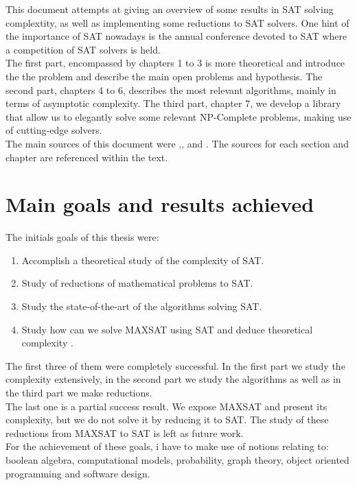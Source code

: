 This document attempts at giving an overview of some results in SAT solving complextity, as well as implementing some reductions to SAT solvers. One hint of the importance of SAT nowadays is the annual conference devoted to SAT where a competition of SAT solvers is held. \\

The first part, encompassed by chapters 1 to 3 is more theoretical and introduce the  the problem and describe the main open problems and hypothesis.
The second part, chapters 4 to 6, describes the most relevant algorithms, mainly in terms of asymptotic complexity. The third part, chapter 7, we develop a library that allow us to elegantly solve some relevant NP-Complete problems, making use of cutting-edge solvers.\\


The main sources of this document were \cite{schoning2013satisfiability},\cite{marek2009introduction},\cite{arora2009computational} and \cite{imms-sat18}. The sources for each section and chapter are referenced within the text.

\section*{Main goals and results achieved}
The initials goals of this thesis were:
\begin{enumerate}
\item Accomplish a theoretical study of the complexity of SAT.
\item Study of reductions of mathematical problems to SAT.
\item Study the state-of-the-art of the algorithms solving SAT.
\item Study how can we solve MAXSAT using SAT and deduce theoretical complexity .
\end{enumerate}

The first three of them were completely successful. In the first part we study the complexity extensively, in the second part we study the algorithms as well as in the third part we make reductions. \\

The last one is a partial success result. We expose MAXSAT and present its complexity, but we do not solve it by reducing it to SAT. The study of these reductions from MAXSAT to SAT is left as future work.\\

For the achievement of these goals, i have to make use of notions relating to: boolean algebra, computational models, probability,  graph theory, object oriented programming and software design.



\endinput
